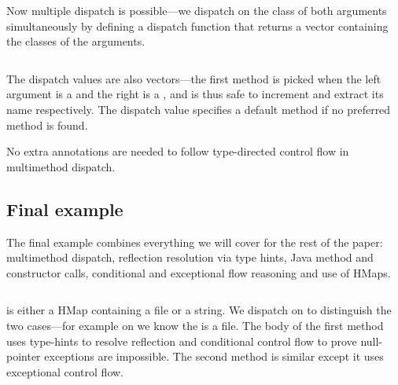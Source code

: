 Now multiple dispatch is possible---we dispatch on the class of both
arguments simultaneously by defining a dispatch function that returns
a vector containing the classes of the arguments.
\begin{Code}
\begin{exmp}
\inputminted[firstline=6,lastline=23]{clojure}{code/demo/src/demo/eg7.clj}
\end{exmp}
\end{Code}
The dispatch values are also vectors---the first method is picked
when the left argument is a  and the right is a ,
and is thus safe to increment and extract its name respectively.
The dispatch value  specifies a default
method if no preferred method is found.

No extra annotations are needed to follow type-directed control flow
in multimethod dispatch.

\subsection{Final example}

The final example combines everything we will cover for the rest of the paper:
multimethod dispatch, reflection resolution via type hints, Java method
and constructor calls, conditional and exceptional flow reasoning
and use of HMaps. 
\begin{Code}
\begin{exmp}
\inputminted[firstline=6,lastline=20]{clojure}{code/demo/src/demo/eg8.clj}
\end{exmp}
\end{Code}
 is either a HMap containing a file
or a string. We dispatch on  to distinguish the two cases---for example on 
we know the  is a file.
The body of the first method uses type-hints to resolve reflection
and conditional control flow to prove null-pointer exceptions are impossible.
The second method is similar except it uses exceptional control flow.









